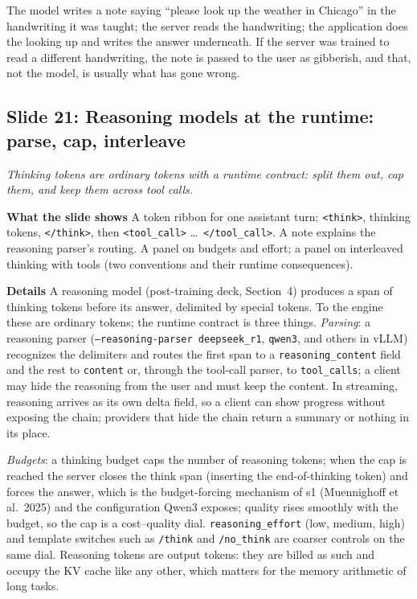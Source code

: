 \documentclass[11pt,letterpaper]{article}
\newcommand{\slide}[3]{%
  \subsection[Slide #1: #2]{Slide #1: #2}%
  {\color{muted}\itshape #3\par}\medskip}
\newcommand{\para}[1]{\medskip\noindent\textbf{#1}\quad}
\newenvironment{intuition}{\begin{tcolorbox}[intuitionbox]}{\end{tcolorbox}}
\begin{document}
\begin{intuition}
The model writes a note saying ``please look up the weather in Chicago'' in the handwriting it was taught; the server reads the handwriting; the application does the looking up and writes the answer underneath. If the server was trained to read a different handwriting, the note is passed to the user as gibberish, and that, not the model, is usually what has gone wrong.
\end{intuition}

\slide{21}{Reasoning models at the runtime: parse, cap, interleave}{Thinking tokens are ordinary tokens with a runtime contract: split them out, cap them, and keep them across tool calls.}

\para{What the slide shows} A token ribbon for one assistant turn: \texttt{<think>}, thinking tokens, \texttt{</think>}, then \texttt{<tool\_call>} \ldots\ \texttt{</tool\_call>}. A note explains the reasoning parser's routing. A panel on budgets and effort; a panel on interleaved thinking with tools (two conventions and their runtime consequences).

\para{Details} A reasoning model (post-training deck, Section~4) produces a span of thinking tokens before its answer, delimited by special tokens. To the engine these are ordinary tokens; the runtime contract is three things. \emph{Parsing}: a reasoning parser (\texttt{--reasoning-parser deepseek\_r1}, \texttt{qwen3}, and others in vLLM) recognizes the delimiters and routes the first span to a \texttt{reasoning\_content} field and the rest to \texttt{content} or, through the tool-call parser, to \texttt{tool\_calls}; a client may hide the reasoning from the user and must keep the content. In streaming, reasoning arrives as its own delta field, so a client can show progress without exposing the chain; providers that hide the chain return a summary or nothing in its place.

\emph{Budgets}: a thinking budget caps the number of reasoning tokens; when the cap is reached the server closes the think span (inserting the end-of-thinking token) and forces the answer, which is the budget-forcing mechanism of s1 (Muennighoff et al.\ 2025) and the configuration Qwen3 exposes; quality rises smoothly with the budget, so the cap is a cost--quality dial. \texttt{reasoning\_effort} (low, medium, high) and template switches such as \texttt{/think} and \texttt{/no\_think} are coarser controls on the same dial. Reasoning tokens are output tokens: they are billed as such and occupy the KV cache like any other, which matters for the memory arithmetic of long tasks.
\end{document}
